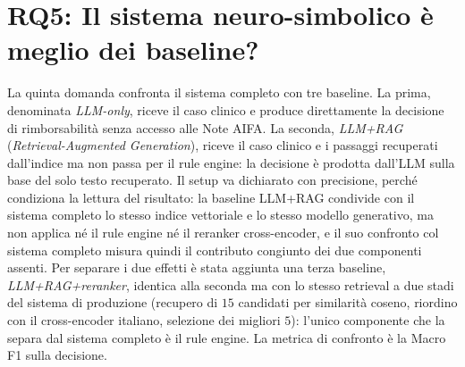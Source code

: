 \section{RQ5: Il sistema neuro-simbolico è meglio dei baseline?}
\label{sec:rq5}

La quinta domanda confronta il sistema completo con tre baseline. La prima, denominata \emph{LLM-only}, riceve il caso clinico e produce direttamente la decisione di rimborsabilità senza accesso alle Note AIFA. La seconda, \emph{LLM+RAG} (\emph{Retrieval-Augmented Generation}), riceve il caso clinico e i passaggi recuperati dall'indice ma non passa per il rule engine: la decisione è prodotta dall'LLM sulla base del solo testo recuperato. Il setup va dichiarato con precisione, perché condiziona la lettura del risultato: la baseline LLM+RAG condivide con il sistema completo lo stesso indice vettoriale e lo stesso modello generativo, ma non applica né il rule engine né il reranker cross-encoder, e il suo confronto col sistema completo misura quindi il contributo congiunto dei due componenti assenti. Per separare i due effetti è stata aggiunta una terza baseline, \emph{LLM+RAG+reranker}, identica alla seconda ma con lo stesso retrieval a due stadi del sistema di produzione (recupero di $15$ candidati per similarità coseno, riordino con il cross-encoder italiano, selezione dei migliori $5$): l'unico componente che la separa dal sistema completo è il rule engine. La metrica di confronto è la Macro F1 sulla decisione.

